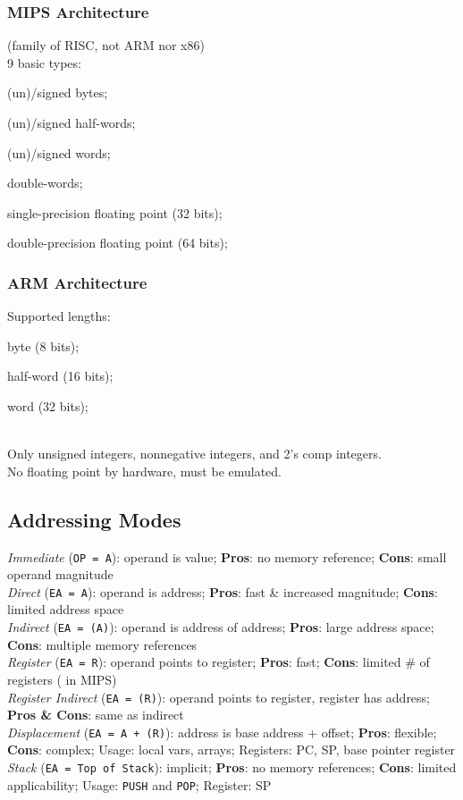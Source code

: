 \subsubsection*{MIPS Architecture}
(family of RISC, not ARM nor x86)\\
9 basic types: \begin{enuminline}
    \item (un)/signed bytes;
    \item (un)/signed half-words;
    \item (un)/signed words;
    \item double-words;
    \item single-precision floating point (32 bits);
    \item double-precision floating point (64 bits);
\end{enuminline}

\subsubsection*{ARM Architecture}
Supported lengths: \begin{enuminline}
    \item byte (8 bits);
    \item half-word (16 bits);
    \item word (32 bits);
\end{enuminline}\\
Only unsigned integers, nonnegative integers, and 2's comp integers.\\
No floating point by hardware, must be emulated.

\subsection*{Addressing Modes}
\emph{Immediate} (\texttt{OP = A}): operand is value; \textbf{Pros}: no memory reference; \textbf{Cons}: small operand magnitude\\
\emph{Direct} (\texttt{EA = A}): operand is address; \textbf{Pros}: fast \& increased magnitude; \textbf{Cons}: limited address space\\
\emph{Indirect} (\texttt{EA = (A)}): operand is address of address; \textbf{Pros}: large address space; \textbf{Cons}: multiple memory references\\
\emph{Register} (\texttt{EA = R}): operand points to register; \textbf{Pros}: fast; \textbf{Cons}: limited \# of registers ( in MIPS)\\
\emph{Register Indirect} (\texttt{EA = (R)}): operand points to register, register has address; \textbf{Pros \& Cons}: same as indirect\\
\emph{Displacement} (\texttt{EA = A + (R)}): address is base address + offset; \textbf{Pros}: flexible; \textbf{Cons}: complex; Usage: local vars, arrays; Registers: PC, SP, base pointer register\\
\emph{Stack} (\texttt{EA = Top of Stack}): implicit; \textbf{Pros}: no memory references; \textbf{Cons}: limited applicability; Usage: \texttt{PUSH} and \texttt{POP}; Register: SP